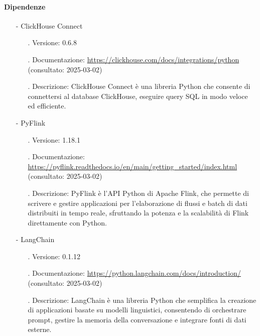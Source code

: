 \documentclass[10pt]{article}
\begin{document}
\begin{justify}
            \paragraph{Dipendenze}
                \begin{itemize}
                    \item[-] ClickHouse Connect
                        \begin{itemize}
                            \item[.] Versione: 0.6.8
                            \item[.] Documentazione: \url{https://clickhouse.com/docs/integrations/python} (consultato: 2025-03-02)
                            \item[.] Descrizione: ClickHouse Connect è una libreria Python che consente di connettersi al database ClickHouse, eseguire query SQL 
                            in modo veloce ed efficiente.
                        \end{itemize}
                    \item[-] PyFlink
                        \begin{itemize}
                            \item[.] Versione: 1.18.1
                            \item[.] Documentazione: \url{https://pyflink.readthedocs.io/en/main/getting_started/index.html} (consultato: 2025-03-02)
                            \item[.] Descrizione: PyFlink è l’API Python di Apache Flink, che permette di scrivere e gestire applicazioni per l'elaborazione di 
                            flussi e batch di dati distribuiti in tempo reale, sfruttando la potenza e la scalabilità di Flink direttamente con Python.
                        \end{itemize}
                    \item[-] LangChain
                        \begin{itemize}
                            \item[.] Versione: 0.1.12
                            \item[.] Documentazione: \url{https://python.langchain.com/docs/introduction/} (consultato: 2025-03-02)
                            \item[.] Descrizione: LangChain è una libreria Python che semplifica la creazione di applicazioni basate su modelli linguistici, 
                            consentendo di orchestrare prompt, gestire la memoria della conversazione e integrare fonti di dati esterne.

\end{itemize}
\end{itemize}
\end{justify}
\end{document}
